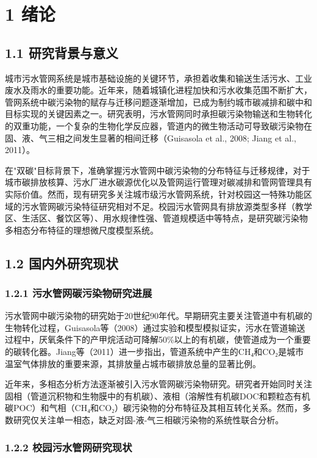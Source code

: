 \section{1 绪论}

\subsection{1.1 研究背景与意义}

城市污水管网系统是城市基础设施的关键环节，承担着收集和输送生活污水、工业废水及雨水的重要功能。近年来，随着城镇化进程加快和污水收集范围不断扩大，管网系统中碳污染物的赋存与迁移问题逐渐增加，已成为制约城市碳减排和碳中和目标实现的关键因素之一。研究表明，污水管网同时承担碳污染物输送和生物转化的双重功能，一个复杂的生物化学反应器，管道内的微生物活动可导致碳污染物在固、液、气三相之间发生显著的相间迁移（Guisasola et al., 2008; Jiang et al., 2011）。

在"双碳"目标背景下，准确掌握污水管网中碳污染物的分布特征与迁移规律，对于城市碳排放核算、污水厂进水碳源优化以及管网运行管理对碳减排和管网管理具有实际价值。然而，现有研究多关注城市级污水管网系统，针对校园这一特殊功能区域的污水管网碳污染特征研究相对不足。校园污水管网具有排放源类型多样（教学区、生活区、餐饮区等）、用水规律性强、管道规模适中等特点，是研究碳污染物多相态分布特征的理想微尺度模型系统。

\subsection{1.2 国内外研究现状}

\subsubsection{1.2.1 污水管网碳污染物研究进展}

污水管网中碳污染物的研究始于20世纪90年代。早期研究主要关注管道中有机碳的生物转化过程，Guisasola等（2008）通过实验和模型模拟证实，污水在管道输送过程中，厌氧条件下的产甲烷活动可降解50\%以上的有机碳，使管道成为一个重要的碳转化器。Jiang等（2011）进一步指出，管道系统中产生的CH₄和CO₂是城市温室气体排放的重要来源，其排放量占城市碳排放总量的显著比例。

近年来，多相态分析方法逐渐被引入污水管网碳污染物研究。研究者开始同时关注固相（管道沉积物和生物膜中的有机碳）、液相（溶解性有机碳DOC和颗粒态有机碳POC）和气相（CH₄和CO₂）碳污染物的分布特征及其相互转化关系。然而，多数研究仅关注单一相态，缺乏对固-液-气三相碳污染物的系统性联合分析。

\subsubsection{1.2.2 校园污水管网研究现状}

